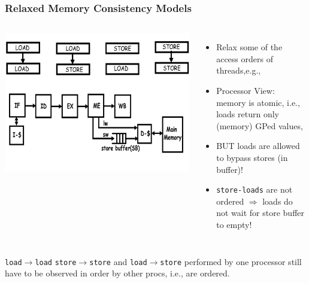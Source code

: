 \documentclass{beamer}
\newcommand{\emp}[1]{\textcolor{DikuRed}{ #1}}
\begin{document}
\begin{frame}[fragile,t]
\frametitle{Relaxed Memory Consistency Models}

\begin{columns}
\includegraphics[width=39ex]{Ch7Figs/SeqConsRelatexOrders}\pause
{}
\begin{itemize}
    \item Relax some of the access orders of threads,e.g.,
    \item Processor View: memory is atomic, i.e., loads return 
            only (memory) GPed values,
    \item \emp{BUT loads are allowed to bypass stores (in buffer)!}
    \item {\tt store-loads} are not ordered $\Rightarrow$ 
            loads do not wait for store buffer to empty!  
\end{itemize}
\end{columns}
\bigskip

{\tt load$\rightarrow$load} {\tt store$\rightarrow$store} and {\tt load$\rightarrow$store}
performed by one processor still have to be observed in order by other procs, i.e., are ordered.

\end{frame}
\end{document}
